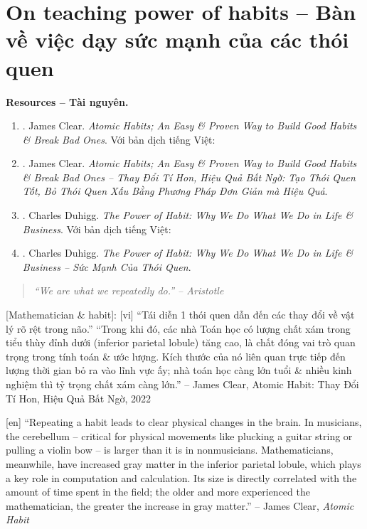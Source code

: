 \documentclass[12pt,oneside]{book}
\begin{document}
\section{On teaching power of habits -- Bàn về việc dạy sức mạnh của các thói quen}
{\bf \textsf{Resources -- Tài nguyên.}}
\begin{enumerate}
	\item \cite{Clear_habit}. {\sc James Clear}. {\it Atomic Habits; An Easy \& Proven Way to Build Good Habits \& Break Bad Ones}. Với bản dịch tiếng Việt:
	\item \cite{Clear_habit_VN}. {\sc James Clear}. {\it Atomic Habits; An Easy \& Proven Way to Build Good Habits \& Break Bad Ones -- Thay Đổi Tí Hon, Hiệu Quả Bất Ngờ: Tạo Thói Quen Tốt, Bỏ Thói Quen Xấu Bằng Phương Pháp Đơn Giản mà Hiệu Quả}.
	\item \cite{Duhigg_habit}. {\sc Charles Duhigg}. {\it The Power of Habit: Why We Do What We Do in Life \& Business}. Với bản dịch tiếng Việt:
	\item \cite{Duhigg_habit_VN}. {\sc Charles Duhigg}. {\it The Power of Habit: Why We Do What We Do in Life \& Business -- Sức Mạnh Của Thói Quen}.
\end{enumerate}

\begin{quote}\it
	``We are what we repeatedly do.'' -- {\sc Aristotle}
\end{quote}
[Mathematician \& habit]: [vi] ``Tái diễn 1 thói quen dẫn đến các thay đổi về vật lý rõ rệt trong não.'' ``Trong khi đó, các nhà Toán học có lượng chất xám trong tiểu thùy đỉnh dưới (inferior parietal lobule) tăng cao, là chất đóng vai trò quan trọng trong tính toán \& ước lượng. Kích thước của nó liên quan trực tiếp đến lượng thời gian bỏ ra vào lĩnh vực ấy; nhà toán học càng lớn tuổi \& nhiều kinh nghiệm thì tỷ trọng chất xám càng lớn.'' -- James Clear, Atomic Habit: Thay Đổi Tí Hon, Hiệu Quả Bất Ngờ, 2022

[en] ``Repeating a habit leads to clear physical changes in the brain. In musicians, the cerebellum -- critical for physical movements like plucking a guitar string or pulling a violin bow -- is larger than it is in nonmusicians. Mathematicians, meanwhile, have increased gray matter in the inferior parietal lobule, which plays a key role in computation and calculation. Its size is directly correlated with the amount of time spent in the field; the older and more experienced the mathematician, the greater the increase in gray matter.'' -- {\sc James Clear}, {\it Atomic Habit} \cite{Clear_habit,Clear_habit_VN}
\end{document}
